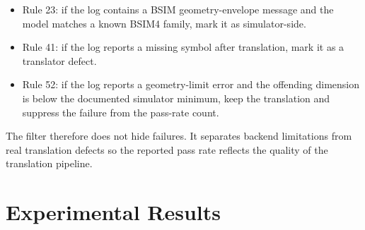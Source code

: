\documentclass[conference]{IEEEtran}
\begin{document}
\begin{itemize}
    \item Rule 23: if the log contains a BSIM geometry-envelope message and the model matches a known BSIM4 family, mark it as simulator-side.
    \item Rule 41: if the log reports a missing symbol after translation, mark it as a translator defect.
    \item Rule 52: if the log reports a geometry-limit error and the offending dimension is below the documented simulator minimum, keep the translation and suppress the failure from the pass-rate count.
\end{itemize}

The filter therefore does not hide failures. It separates backend limitations from real translation defects so the reported pass rate reflects the quality of the translation pipeline.


\section{Experimental Results}
\label{section:results}
\end{document}
